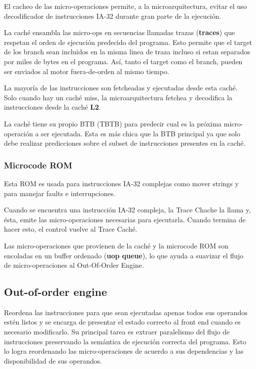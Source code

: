 El cacheo de las micro-operaciones permite, a la microarquitectura, evitar el uso decodificador de instrucciones IA-32 durante gran parte de la ejecución.

La caché ensambla las micro-ops en secuencias llamadas trazas (\textbf{traces}) que respetan el orden de ejecución predecido del programa. Esto permite que el target de los branch sean incluidos en la misma linea de traza incluso si estan separados por miles de bytes en el programa. Así, tanto el target como el branch, pueden ser enviados al motor fuera-de-orden al mismo tiempo.

La mayoría de las instrucciones son fetcheadas y ejecutadas desde esta caché. Solo cuando hay un caché miss, la microarquitectura fetchea y decodifica la instrucciones desde la caché \textbf{L2}.

La caché tiene su propio BTB (TBTB) para predecir cual es la próxima micro-operación a ser ejecutada. Esta es más chica que la BTB principal ya que solo debe realizar predicciones sobre el subset de instrucciones presentes en la caché.

\subsubsection*{Microcode ROM}
Esta ROM es usada para instrucciones IA-32 complejas como mover strings y para manejar faults e interrupciones.

Cuando se encuentra una instrucción IA-32 compleja, la Trace Chache la llama y, ésta, emite las micro-operaciones necesarias para ejecutarla. Cuando termina de hacer esto, el control vuelve al Trace Caché.

Las micro-operaciones que provienen de la caché y la microcode ROM son encoladas en un buffer ordenado (\textbf{uop queue}), lo que ayuda a suavizar el flujo de micro-operaciones al Out-Of-Order Engine.

\subsection{Out-of-order engine}
Reordena las instrucciones para que sean ejecutadas apenas todos sus operandos estén listos y se encarga de presentar el estado correcto al front end cuando es necesario modificarlo. Su principal tarea es extraer paralelismo del flujo de instrucciones preservando la semántica de ejecución correcta del programa. Esto lo logra reordenando las micro-operaciones de acuerdo a sus dependencias y las disponibilidad de sus operandos.


